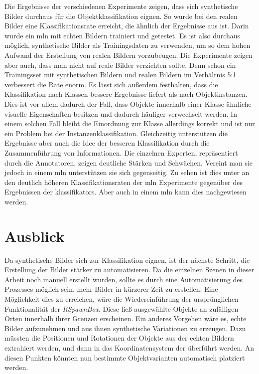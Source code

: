 Die Ergebnisse der verschiedenen Experimente zeigen, dass sich synthetische Bilder durchaus für die Objektklassifikation eignen. So wurde bei den realen Bilder eine Klassifikationsrate erreicht, die ähnlich der Ergebnisse aus \cite{pr2looking} ist. Darin wurde ein \gls{mln} mit echten Bildern trainiert und getestet. Es ist also durchaus möglich, synthetische Bilder als Trainingsdaten zu verwenden, um so dem hohen Aufwand der Erstellung von realen Bildern vorzubeugen. Die Experimente zeigen aber auch, dass man nicht auf reale Bilder verzichten sollte. Denn schon ein Trainingsset mit synthetischen Bildern und realen Bildern im Verhältnis 5:1 verbessert die Rate enorm. Es lässt sich außerdem festhalten, dass die Klassifikation nach Klassen bessere Ergebnisse liefert als nach Objektinstanzen. Dies ist vor allem dadurch der Fall, dass Objekte innerhalb einer Klasse ähnliche visuelle Eigenschaften besitzen und dadurch häufiger verwechselt werden. In einem solchen Fall bleibt die Einordnung zur Klasse allerdings korrekt und ist nur ein Problem bei der Instanzenklassifikation.   \newline
Gleichzeitig unterstützen die Ergebnisse aber auch die Idee der besseren Klassifikation durch die Zusammenführung von Informationen. Die einzelnen Experten, repräsentiert durch die \robosherlock Annotatoren, zeigen deutliche Stärken und Schwächen. Vereint man sie jedoch in einem \gls{mln} unterstützen sie sich gegenseitig. Zu sehen ist dies unter an den deutlich höheren Klassifikationsraten der \gls{mln} Experimente gegenüber des Ergebnissen der \glspl{klassifikator}. Aber auch in einem \gls{mln} kann dies nachgewiesen werden. 

\section{Ausblick}
\label{chap:ausblick}   

Da synthetische Bilder sich zur Klassifikation eignen, ist der nächste Schritt, die Erstellung der Bilder stärker zu automatisieren. Da die einzelnen Szenen in dieser Arbeit noch manuell erstellt wurden, sollte es durch eine Automatisierung des Prozesses möglich sein, mehr Bilder in kürzerer Zeit zu erstellen. Eine Möglichkeit dies zu erreichen, wäre die Wiedereinführung der ursprünglichen Funktionalität der \textit{RSpawnBox}. Diese ließ ausgewählte Objekte an zufälligen Orten innerhalb ihrer Grenzen erscheinen. Ein anderes Vorgehen wäre es, echte Bilder aufzunehmen und aus ihnen synthetische Variationen zu erzeugen. Dazu müssten die Positionen und Rotationen der Objekte aus der echten Bildern extrahiert werden, und dann in das Koordinatensystem der \unreal überführt werden. An diesen Punkten könnten nun bestimmte Objektvarianten automatisch platziert werden. \par 

